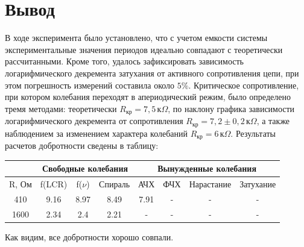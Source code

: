 \documentclass[a4paper,12pt]{article}
\theoremstyle{definition}
\begin{document}
\section{Вывод}
В ходе эксперимента было установлено, что с учетом емкости системы экспериментальные значения периодов идеально совпадают с теоретически рассчитанными. Кроме того, удалось зафиксировать зависимость логарифмического декремента затухания от активного сопротивления цепи, при этом погрешность измерений составила около $5\%$. Критическое сопротивление, при котором колебания переходят в апериодический режим, было определено тремя методами: теоретически $R_{\text{кр}} = 7{,}5 \, \text{к}\Omega$, по наклону графика зависимости логарифмического декремента от сопротивления $R_{\text{кр}} = 7{,}2 \pm 0{,}2 \, \text{к}\Omega$, а также наблюдением за изменением характера колебаний $R_{\text{кр}} = 6 \, \text{к}\Omega$.
Результаты расчетов добротности сведены в таблицу: \\
    \begin{center}
        \begin{tabular}{|c|c|c|c|c|c|c|c|} \hline
             &\multicolumn{3}{c}{Свободные колебания} &\multicolumn{4}{|c|}{Вынужденные колебания} \\ \hline{}
           R, Ом & f(LCR) & f($\nu$) & Спираль& АЧХ & ФЧХ & Нарастание & Затухание\\ \hline
          410 &9.16 & 8.97& 8.49 & 7.91 & -& -&- \\ \hline
          1600 & 2.34 & 2.4& 2.21 & - & -& -&- \\ \hline
        \end{tabular}
            
    \end{center}

 Как видим, все добротности хорошо совпали.
\end{document}
